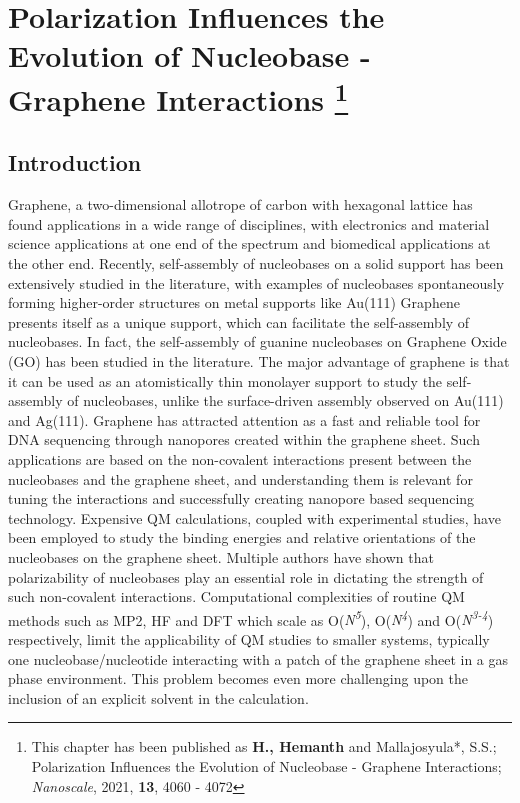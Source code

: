 \chapter[Polarization Influences the Evolution of Nucleobase -  Graphene Interactions]{Polarization Influences the Evolution of Nucleobase -  Graphene Interactions \protect\footnote[2]{This chapter has been published as \textbf{H., Hemanth} and Mallajosyula*, S.S.; Polarization Influences the Evolution of Nucleobase - Graphene Interactions; {\textit{Nanoscale}, 2021, \textbf{13}, 4060 - 4072}}}
\section{Introduction}
Graphene, a two-dimensional allotrope of carbon with hexagonal lattice has found applications in a wide range of disciplines, with electronics and material science applications at one end of the spectrum and biomedical applications at the other end.\supercite{geim_rise_2007, geim_graphene_2009, lalwani_two-dimensional_2013, akinwande_large-area_2015}  Recently, self-assembly of nucleobases on a solid support has been extensively studied in the literature, with examples of nucleobases spontaneously forming higher-order structures on metal supports like Au(111)\supercite{kelly_understanding_2008, lukas_adenine_2009} Graphene presents itself as a unique support, which can facilitate the self-assembly of nucleobases. In fact, the self-assembly of guanine nucleobases on Graphene Oxide (GO) has been studied in the literature.\supercite{chiorcea_afm_2005} The major advantage of graphene is that it can be used as an atomistically thin monolayer support to study the self-assembly of nucleobases, unlike the surface-driven assembly observed on Au(111) and Ag(111). Graphene has attracted attention as a fast and reliable tool for DNA sequencing\supercite{heerema_graphene_2016, wells_assessing_2012, dontschuk_graphene_2015, schneider_tailoring_2013} through nanopores created within the graphene sheet. Such applications are based on the non-covalent interactions present between the nucleobases and the graphene sheet, and understanding them is relevant for tuning the interactions and successfully creating nanopore based sequencing technology. Expensive QM calculations,\supercite{umadevi_quantum_2011, cho_noncovalent_2013, gowtham_physisorption_2007, umadevi_noncovalent_2014, lee_physisorption_2013} coupled with experimental studies,\supercite{varghese_binding_2009} have been employed to study the binding energies and relative orientations of the nucleobases on the graphene sheet. Multiple authors have shown that polarizability\supercite{gowtham_physisorption_2007, lee_physisorption_2013} of nucleobases play an essential role in dictating the strength of such non-covalent interactions. Computational complexities of routine QM methods such as MP2, HF and DFT which scale as O(\textit{N\textsuperscript{5}}), O(\textit{N\textsuperscript{4}}) and O(\textit{N\textsuperscript{3-4}}) respectively, limit the applicability of QM studies to smaller systems, typically one nucleobase/nucleotide interacting with a patch of the graphene sheet in a gas phase environment. This problem becomes even more challenging upon the inclusion of an explicit solvent in the calculation.

